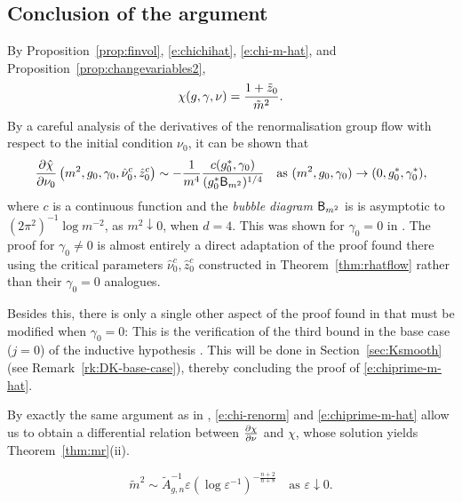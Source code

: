 
\subsection{Conclusion of the argument}
\label{sec:suscept-conc}

By Proposition~\ref{prop:finvol}, \eqref{e:chichihat}, \eqref{e:chi-m-hat},
and Proposition~\ref{prop:changevariables2},
\begin{equation}
\label{e:chi-renorm}
\chi(g, \gamma, \nu)
	=
\frac{1 + \tilde z_0}{\tilde m^2}.
\end{equation}
By a careful analysis of the derivatives of the renormalisation group flow with
respect to the initial condition $\nu_0$, it can be shown that
\begin{equation}
\label{e:chiprime-m-hat}
\frac{\partial \hat\chi}{\partial \nu_0} \left(m^2,g_0, \gamma_0,\hat\nu_0^c, \hat z_0^c \right)
	\sim
-\frac{1}{m^4} \frac{c(g_0^*, \gamma_0)}{(g_0^*{\sf B}_{m^2})^{1/4}}
	\quad
\text{as $(m^2,g_0,\gamma_0) \rightarrow (0,g_0^*,\gamma_0^*)$},
\end{equation}
where $c$ is a continuous function and the \emph{bubble diagram} ${\sf B}_{m^2}$ is
is asymptotic to $(2\pi^2)^{-1} \log m^{-2}$, as $m^2 \downarrow 0$, when $d = 4$.
This was shown for $\gamma_0 = 0$ in \cite[Section~\ref{log-sec:pfmr}]{BBS-saw4-log}.
The proof for $\gamma_0 \ne 0$ is almost entirely a direct adaptation of the proof
found there using the critical parameters $\hat\nu_0^c, \hat z_0^c$ constructed
in Theorem~\ref{thm:rhatflow} rather than their $\gamma_0 = 0$ analogues.

Besides this, there is only a single other aspect of the proof found in \cite{BBS-saw4-log}
that must be modified when $\gamma_0 = 0$: This is the verification of the third bound
in the base case ($j = 0$) of the inductive hypothesis \cite[\eqref{log-e:induct1}]{BBS-saw4-log}.
This will be done in Section~\ref{sec:Ksmooth} (see Remark~\ref{rk:DK-base-case}),
thereby concluding the proof of \eqref{e:chiprime-m-hat}.

By exactly the same argument as in \cite[Section~\ref{log-sec:pfsuscept}]{BBS-saw4-log},
\eqref{e:chi-renorm} and \eqref{e:chiprime-m-hat} allow us to obtain
a differential relation between $\frac{\partial \chi}{\partial \nu}$ and $\chi$,
whose solution yields Theorem~\ref{thm:mr}(ii).


\begin{equation}
\label{e:mass-epsilon-asympt}
\tilde m^2
	\sim
\tilde A_{g,n}^{-1} \varepsilon (\log \varepsilon^{-1})^{-\frac{n + 2}{n + 8}}
	\quad
\text{as $\varepsilon \downarrow 0$}.
\end{equation}

